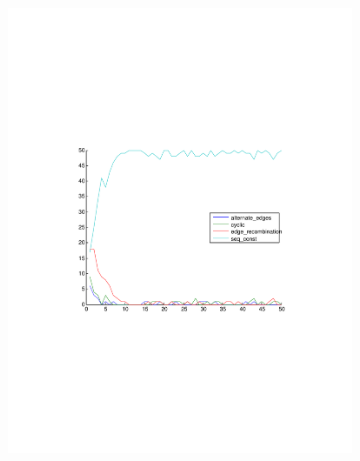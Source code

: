 \documentclass[a4paper]{article}
\begin{document}
\begin{figure}[h]
	\centering
    \begin{subfigure}[h]{0.49\textwidth}
    \includegraphics[width=\textwidth,trim={4cm 8cm 4cm 8cm},clip]{mwcx}
    \end{subfigure}
    \begin{subfigure}[h]{0.49\textwidth}

\end{subfigure}
\end{figure}
\end{document}
